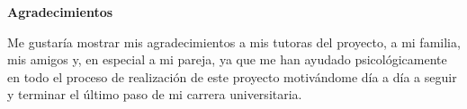 \begin{center}
	\bigskip
	\bigskip
	\textbf{\huge {Agradecimientos}}\\
	\bigskip
\end{center}

Me gustaría mostrar mis agradecimientos a mis tutoras del proyecto, a mi familia, mis amigos y, en especial a mi pareja, ya que me han ayudado psicológicamente en todo el proceso de realización de este proyecto motivándome día a día a seguir y terminar el último paso de mi carrera universitaria.